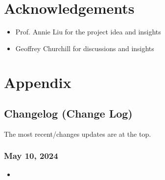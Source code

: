 \documentclass[12pt]{article}
\begin{document}
    \section{Acknowledgements}
    \label{sec:ack}

    \begin{itemize}
        \item Prof. Annie Liu for the project idea and insights
        \item Geoffrey Churchill for discussions and insights
    \end{itemize}


    \newpage
    
    
    
    

    \newpage
    
    \section{Appendix}
    \label{sec:appendix}

    \subsection{Changelog (Change Log)}
    \label{subsec:change}

    The most recent/changes updates are at the top.

    \subsubsection{May 10, 2024}

    

    \begin{itemize}
        \item 
    \end{itemize}
\end{document}
